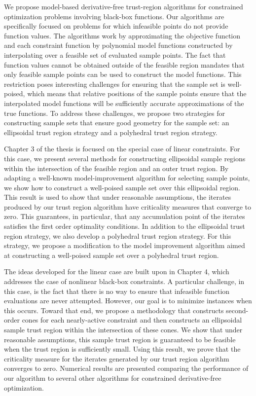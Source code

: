 
We propose model-based derivative-free trust-region algorithms for constrained optimization problems involving black-box functions.
Our algorithms are specifically focused on problems for which infeasible points do not provide function values.
The algorithms work by approximating the objective function and each constraint function by polynomial model functions 
constructed by interpolating over a feasible set of evaluated sample points.
The fact that function values cannot be obtained outside of the feasible region mandates that 
only feasible sample points can be used to construct the model functions.
This restriction poses interesting challenges for ensuring that the sample set is well-poised, 
which means that relative positions of the sample points ensure that the interpolated model functions will be
sufficiently accurate approximations of the true functions.
To address these challenges, we propose two strategies for constructing sample sets that ensure good geometry for the sample set: 
an ellipsoidal trust region strategy and a polyhedral trust region strategy.   

Chapter 3 of the thesis is focused on the special case of linear constraints.
For this case, we present several methods for constructing ellipsoidal sample regions within the intersection of the feasible region and an outer trust region.
By adapting a well-known model-improvement algorithm for selecting sample points,
we show how to construct a well-poised sample set over this ellipsoidal region.
This result is used to show that under reasonable assumptions,  
the iterates produced by our trust region algorithm have criticality measures that converge to zero.
This guarantees, in particular, that any accumulation point of the iterates satisfies the first order optimality conditions.
In addition to the ellipsoidal trust region strategy, we also develop a polyhedral trust region strategy.
For this strategy, we propose a modification to the model improvement algorithm aimed at constructing a well-poised sample set over 
a polyhedral trust region.

The ideas developed for the linear case are built upon in Chapter 4, which addresses the case of nonlinear black-box constraints.
A particular challenge, in this case, is the fact that there is no way to ensure that infeasible function evaluations are never attempted.
However, our goal is to minimize instances when this occurs.
Toward that end, we propose a methodology that constructs second-order cones for each nearly-active constraint 
and then constructs an ellipsoidal sample trust region within the intersection of these cones.
We show that under reasonable assumptions, this sample trust region is guaranteed to be feasible when the trust region is sufficiently small.
Using this result, we prove that the criticality measure for the iterates generated by our trust region algorithm converges to zero.
Numerical results are presented comparing the performance of our algorithm to several other algorithms for constrained derivative-free optimization.
 
